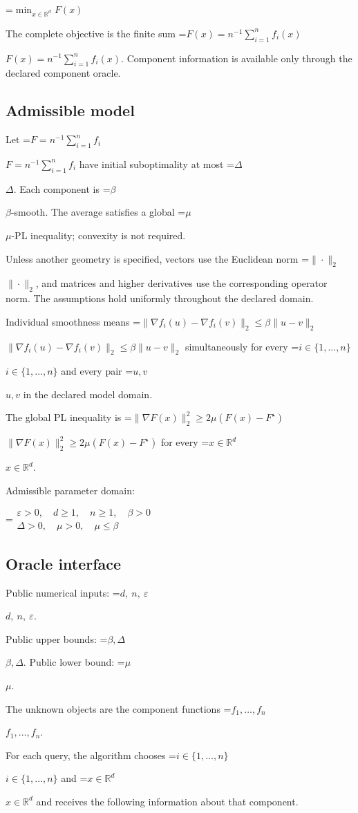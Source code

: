 \documentclass[10pt,a4paper]{article}
\newcommand{\AtlasMath}[1]{\par\begingroup\centering\setbox0=\hbox{$\displaystyle #1$}\ifdim\wd0>1.4\linewidth\typeout{ATLAS WIDE FORMULA: \the\wd0}\fi\ifdim\wd0>\linewidth\resizebox{\linewidth}{!}{\box0}\else\box0\fi\par\endgroup}
\newcommand{\AtlasInlineMath}[1]{\begingroup\setbox0=\hbox{$#1$}\ifdim\wd0>.4\linewidth\endgroup\AtlasMath{#1}\else\endgroup$#1$\fi}
\begin{document}
\AtlasMath{\min_{x\in \mathbb{R}^d}F(x)}


The complete objective is the finite sum \AtlasInlineMath{F(x)=n^{-1}\sum_{i=1}^n f_i(x)}. Component information is available only through the declared component oracle.

\subsection{Admissible model}
Let \AtlasInlineMath{F=n^{-1}\sum_{i=1}^n f_i} have initial suboptimality at most \AtlasInlineMath{\Delta}. Each component is \AtlasInlineMath{\beta}-smooth. The average satisfies a global \AtlasInlineMath{\mu}-PL inequality; convexity is not required.

Unless another geometry is specified, vectors use the Euclidean norm \AtlasInlineMath{\|\cdot\|_2}, and matrices and higher derivatives use the corresponding operator norm. The assumptions hold uniformly throughout the declared domain.

Individual smoothness means \AtlasInlineMath{\|\nabla f_i(u)-\nabla f_i(v)\|_2\le\beta\|u-v\|_2} simultaneously for every \AtlasInlineMath{i\in\{1,\ldots,n\}} and every pair \AtlasInlineMath{u,v} in the declared model domain.

The global PL inequality is \AtlasInlineMath{\|\nabla F(x)\|_2^2\ge2\mu(F(x)-F^\star)} for every \AtlasInlineMath{x\in\mathbb R^d}.

Admissible parameter domain:


\AtlasMath{\begin{gathered}\varepsilon > 0,\quad d \ge 1,\quad n \ge 1,\quad \beta > 0\\\Delta > 0,\quad \mu > 0,\quad \mu \le \beta\end{gathered}}


\subsection{Oracle interface}
Public numerical inputs: \AtlasInlineMath{d,\ n,\ \varepsilon}.

Public upper bounds: \AtlasInlineMath{\beta,\Delta}. Public lower bound: \AtlasInlineMath{\mu}.

The unknown objects are the component functions \AtlasInlineMath{f_1,\ldots,f_n}.

For each query, the algorithm chooses \AtlasInlineMath{i\in\{1,\ldots,n\}} and \AtlasInlineMath{x\in\mathbb R^d} and receives the following information about that component.
\end{document}
